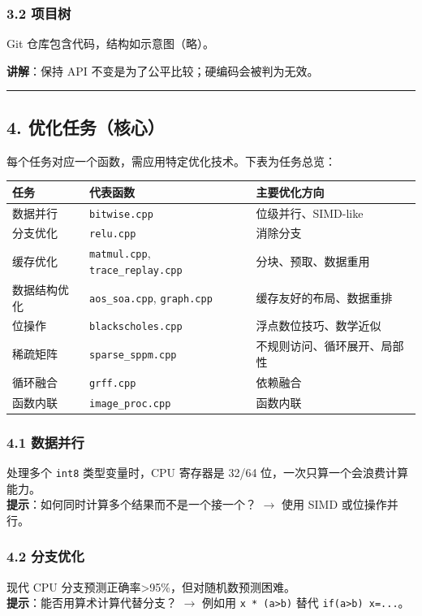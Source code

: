 \documentclass[11pt, a4paper]{article}
\begin{document}
\begin{aibox}
\subsubsection*{3.2 项目树}
Git 仓库包含代码，结构如示意图（略）。

\textbf{讲解}：保持 API 不变是为了公平比较；硬编码会被判为无效。

\begin{center}\rule{\textwidth}{0.4pt}\end{center}

\subsection*{4. 优化任务（核心）}

每个任务对应一个函数，需应用特定优化技术。下表为任务总览：

\vspace{0.5em}
\begin{tabularx}{\textwidth}{@{} l l X @{}}
\toprule
任务 & 代表函数 & 主要优化方向 \\
\midrule
数据并行 & \texttt{bitwise.cpp} & 位级并行、SIMD-like \\
分支优化 & \texttt{relu.cpp} & 消除分支 \\
缓存优化 & \texttt{matmul.cpp}, \texttt{trace\_replay.cpp} & 分块、预取、数据重用 \\
数据结构优化 & \texttt{aos\_soa.cpp}, \texttt{graph.cpp} & 缓存友好的布局、数据重排 \\
位操作 & \texttt{blackscholes.cpp} & 浮点数位技巧、数学近似 \\
稀疏矩阵 & \texttt{sparse\_sppm.cpp} & 不规则访问、循环展开、局部性 \\
循环融合 & \texttt{grff.cpp} & 依赖融合 \\
函数内联 & \texttt{image\_proc.cpp} & 函数内联 \\
\bottomrule
\end{tabularx}
\vspace{0.5em}

\subsubsection*{4.1 数据并行}
处理多个 \texttt{int8} 类型变量时，CPU 寄存器是 32/64 位，一次只算一个会浪费计算能力。\\
\textbf{提示}：如何同时计算多个结果而不是一个接一个？ $\rightarrow$ 使用 SIMD 或位操作并行。

\subsubsection*{4.2 分支优化}
现代 CPU 分支预测正确率>95\%，但对随机数预测困难。\\
\textbf{提示}：能否用算术计算代替分支？ $\rightarrow$ 例如用 \texttt{x * (a>b)} 替代 \texttt{if(a>b) x=...}。


\end{aibox}
\end{document}
